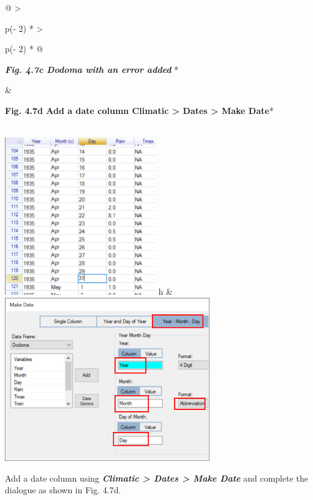 \documentclass[
  letterpaper,
  DIV=11,
  numbers=noendperiod]{scrreprt}
\begin{document}
\begin{longtable}[]{@{}
  >{\raggedright\arraybackslash}p{(\columnwidth - 2\tabcolsep) * }
  >{\raggedright\arraybackslash}p{(\columnwidth - 2\tabcolsep) * }@{}}
\toprule\noalign{}
\begin{minipage}[b]{\linewidth}\raggedright
\textbf{\emph{Fig. 4.7c Dodoma with an error added}} *
\end{minipage} & \begin{minipage}[b]{\linewidth}\raggedright
\textbf{Fig. 4.7d Add a date column Climatic \textgreater{} Dates
\textgreater{} Make Date}*
\end{minipage} \\
\midrule\noalign{}
\endhead
\bottomrule\noalign{}
\endlastfoot
\includegraphics[width=2.56256in,height=2.68007in]{figures/Fig4.7c.png}
h &
\includegraphics[width=3.47766in,height=\textheight]{figures/Fig4.7d.png} \\
\end{longtable}

Add a date column using \textbf{\emph{Climatic \textgreater{} Dates
\textgreater{} Make Date}} and complete the dialogue as shown in Fig.
4.7d.
\end{document}
